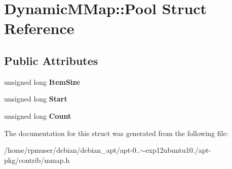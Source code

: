 \section{\-Dynamic\-M\-Map\-:\-:\-Pool \-Struct \-Reference}
\label{structDynamicMMap_1_1Pool}
\subsection*{\-Public \-Attributes}
\begin{DoxyCompactItemize}
\item 
unsigned long {\bfseries \-Item\-Size}\label{structDynamicMMap_1_1Pool_af280c456d0296b2c593491f966371a4d}

\item 
unsigned long {\bfseries \-Start}\label{structDynamicMMap_1_1Pool_addcf1e7575065cf383043105d4c3fd69}

\item 
unsigned long {\bfseries \-Count}\label{structDynamicMMap_1_1Pool_aea0c30b4eedd2bafcd5e7666344c260d}

\end{DoxyCompactItemize}


\-The documentation for this struct was generated from the following file\-:\begin{DoxyCompactItemize}
\item 
/home/rpmuser/debian/debian\-\_\-apt/apt-\/0..$\sim$exp12ubuntu10./apt-\/pkg/contrib/mmap.\-h\end{DoxyCompactItemize}
